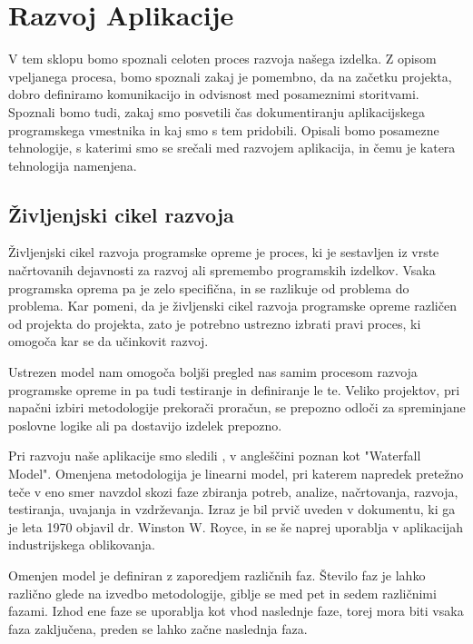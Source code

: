 \documentclass[a4paper, 12pt]{book}
\begin{document}
\chapter{Razvoj Aplikacije}
\label{razvoj}
V tem sklopu bomo spoznali celoten proces razvoja našega izdelka. Z opisom vpeljanega procesa, bomo spoznali zakaj je pomembno, da na začetku projekta, dobro definiramo komunikacijo in odvisnost med posameznimi storitvami. Spoznali bomo tudi, zakaj smo posvetili čas dokumentiranju aplikacijskega programskega vmestnika in kaj smo s tem pridobili. Opisali bomo posamezne tehnologije, s katerimi smo se srečali med razvojem aplikacija, in čemu je katera tehnologija namenjena. 

\section{Življenjski cikel razvoja }
Življenjski cikel razvoja programske opreme je proces, ki je sestavljen iz vrste načrtovanih dejavnosti za razvoj ali spremembo programskih izdelkov. Vsaka programska oprema pa je zelo specifična, in se razlikuje od problema do problema. Kar pomeni, da je življenski cikel razvoja programske opreme različen od projekta do projekta, zato je potrebno ustrezno izbrati pravi proces, ki omogoča kar se da učinkovit razvoj.

Ustrezen model nam omogoča boljši pregled nas samim procesom razvoja programske opreme in pa tudi testiranje in definiranje le te. Veliko projektov, pri napačni izbiri metodologije prekorači proračun, se prepozno odloči za spreminjane poslovne logike ali pa dostavijo izdelek prepozno. 

Pri razvoju naše aplikacije smo sledili , v angleščini poznan kot "Waterfall Model". Omenjena metodologija je linearni model, pri katerem napredek pretežno teče v eno smer navzdol skozi faze zbiranja potreb, analize, načrtovanja, razvoja, testiranja, uvajanja in vzdrževanja. Izraz je bil prvič uveden v dokumentu, ki ga je leta 1970 objavil dr. Winston W. Royce, in se še naprej uporablja v aplikacijah industrijskega oblikovanja. \cite{waterfall-model}

Omenjen model je definiran z zaporedjem različnih faz. Število faz je lahko različno glede na izvedbo metodologije, giblje se med pet in sedem različnimi fazami. Izhod ene faze se uporablja kot vhod naslednje faze, torej mora biti vsaka faza zaključena, preden se lahko začne naslednja faza.
\end{document}

